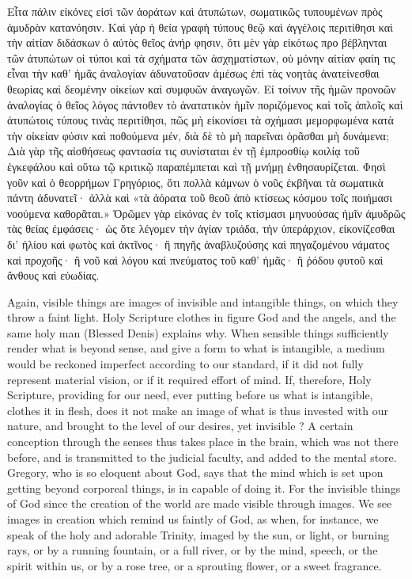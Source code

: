 \documentclass[10pt]{book}
\newcommand{\switchenglish}{\selectlanguage{english} \switchcolumn}
\begin{document}
\begin{paracol}{2}
Εἶτα πάλιν εἰκόνες εἰσὶ τῶν ἀοράτων καὶ ἀτυπώτων, σωματικῶς τυπουμένων πρὸς ἀμυδρὰν κατανόησιν. Καὶ γὰρ ἡ θεία γραφὴ τύπους θεῷ καὶ ἀγγέλοις περιτίθησι καὶ τὴν αἰτίαν διδάσκων ὁ αὐτὸς θεῖος ἀνήρ φησιν, ὅτι μὲν γὰρ εἰκότως προ βέβληνται τῶν ἀτυπώτων οἱ τύποι καὶ τὰ σχήματα τῶν ἀσχηματίστων, οὐ μόνην αἰτίαν φαίη τις εἶναι τὴν καθ’ ἡμᾶς ἀναλογίαν ἀδυνατοῦσαν ἀμέσως ἐπὶ τὰς νοητὰς ἀνατείνεσθαι θεωρίας καὶ δεομένην οἰκείων καὶ συμφυῶν ἀναγωγῶν. Εἰ τοίνυν τῆς ἡμῶν προνοῶν ἀναλογίας ὁ θεῖος λόγος πάντοθεν τὸ ἀνατατικὸν ἡμῖν ποριζόμενος καὶ τοῖς ἁπλοῖς καὶ ἀτυπώτοις τύπους τινὰς περιτίθησι, πῶς μὴ εἰκονίσει τὰ σχήμασι μεμορφωμένα κατὰ τὴν οἰκείαν φύσιν καὶ ποθούμενα μέν, διὰ δὲ τὸ μὴ παρεῖναι ὁρᾶσθαι μὴ δυνάμενα; Διὰ γὰρ τῆς αἰσθήσεως φαντασία τις συνίσταται ἐν τῇ ἐμπροσθίῳ κοιλίᾳ τοῦ ἐγκεφάλου καὶ οὕτω τῷ κριτικῷ παραπέμπεται καὶ τῇ μνήμῃ ἐνθησαυρίζεται. Φησὶ γοῦν καὶ ὁ θεορρήμων Γρηγόριος, ὅτι πολλὰ κάμνων ὁ νοῦς ἐκβῆναι τὰ σωματικὰ πάντη ἀδυνατεῖ· ἀλλὰ καὶ «τὰ ἀόρατα τοῦ θεοῦ ἀπὸ κτίσεως κόσμου τοῖς ποιήμασι νοούμενα καθορᾶται.» Ὁρῶμεν γὰρ εἰκόνας ἐν τοῖς κτίσμασι μηνυούσας ἡμῖν ἀμυδρῶς τὰς θείας ἐμφάσεις· ὡς ὅτε λέγομεν τὴν ἁγίαν τριάδα, τὴν ὑπεράρχιον, εἰκονίζεσθαι δι’ ἡλίου καὶ φωτὸς καὶ ἀκτῖνος· ἢ πηγῆς ἀναβλυζούσης καὶ πηγαζομένου νάματος καὶ προχοῆς· ἢ νοῦ καὶ λόγου καὶ πνεύματος τοῦ καθ’ ἡμᾶς· ἢ ῥόδου φυτοῦ καὶ ἄνθους καὶ εὐωδίας.

\switchenglish

Again, visible things are images of 
invisible and intangible things, on which they 
throw a faint light. Holy Scripture clothes in 
figure God and the angels, and the same holy 
man (Blessed Denis) explains why. When 
sensible things sufficiently render what is 
beyond sense, and give a form to what is 
intangible, a medium would be reckoned 
imperfect according to our standard, if it did 
not fully represent material vision, or if it 
required effort of mind. If, therefore, Holy 
Scripture, providing for our need, ever putting 
before us what is intangible, clothes it in flesh, 
does it not make an image of what is thus 
invested with our nature, and brought to the 
level of our desires, yet invisible ? A certain 
conception through the senses thus takes place 
in the brain, which was not there before, and is 
transmitted to the judicial faculty, and added to 
the mental store. Gregory, who is so eloquent 
about God, says that the mind which is set 
upon getting beyond corporeal things, is in 
capable of doing it. For the invisible things of 
God since the creation of the world are made 
visible through images. We see images in 
creation which remind us faintly of God, as 
when, for instance, we speak of the holy and 
adorable Trinity, imaged by the sun, or light, 
or burning rays, or by a running fountain, or a 
full river, or by the mind, speech, or the spirit 
within us, or by a rose tree, or a sprouting 
flower, or a sweet fragrance. 


\end{paracol}
\end{document}
